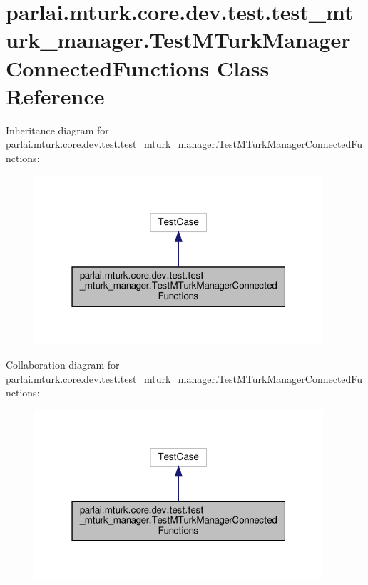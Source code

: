 \hypertarget{classparlai_1_1mturk_1_1core_1_1dev_1_1test_1_1test__mturk__manager_1_1TestMTurkManagerConnectedFunctions}{}\section{parlai.\+mturk.\+core.\+dev.\+test.\+test\+\_\+mturk\+\_\+manager.\+Test\+M\+Turk\+Manager\+Connected\+Functions Class Reference}
\label{classparlai_1_1mturk_1_1core_1_1dev_1_1test_1_1test__mturk__manager_1_1TestMTurkManagerConnectedFunctions}


Inheritance diagram for parlai.\+mturk.\+core.\+dev.\+test.\+test\+\_\+mturk\+\_\+manager.\+Test\+M\+Turk\+Manager\+Connected\+Functions\+:\nopagebreak
\begin{figure}[H]
\begin{center}
\leavevmode
\includegraphics[width=304pt]{d4/d2d/classparlai_1_1mturk_1_1core_1_1dev_1_1test_1_1test__mturk__manager_1_1TestMTurkManagerConnectedFunctions__inherit__graph}
\end{center}
\end{figure}


Collaboration diagram for parlai.\+mturk.\+core.\+dev.\+test.\+test\+\_\+mturk\+\_\+manager.\+Test\+M\+Turk\+Manager\+Connected\+Functions\+:\nopagebreak
\begin{figure}[H]
\begin{center}
\leavevmode
\includegraphics[width=304pt]{d3/d55/classparlai_1_1mturk_1_1core_1_1dev_1_1test_1_1test__mturk__manager_1_1TestMTurkManagerConnectedFunctions__coll__graph}
\end{center}
\end{figure}
